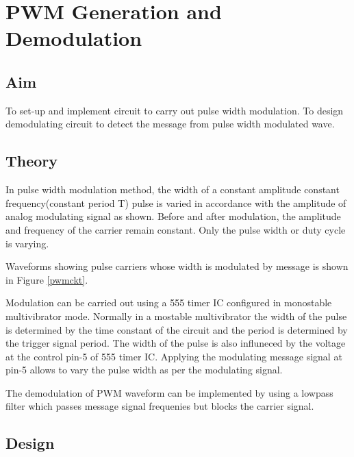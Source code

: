 \chapter[PWM Generation and Demodulation]{PWM Generation and Demodulation}

\section*{Aim}

To set-up and implement circuit to carry out pulse width modulation. To design demodulating circuit to detect the message from pulse width modulated wave.
\section*{Theory}
In pulse width modulation method, the width of a constant amplitude constant frequency(constant period T) pulse is varied in accordance with the amplitude of analog modulating signal as shown. Before and after modulation, the amplitude and frequency of the carrier remain constant. Only the pulse width or duty cycle is varying.

Waveforms showing pulse carriers whose width is modulated by message is shown in Figure  \ref{pwmckt}.

Modulation can be carried out using a 555 timer IC configured in monostable multivibrator mode. Normally in a mostable multivibrator the width of the pulse is determined by the time constant of the circuit and the period is determined by the trigger signal period. The width of the pulse is also influneced by the voltage at the control pin-5 of 555 timer IC.  Applying the modulating message signal at pin-5 allows to vary the pulse width as per the modulating signal. 

The demodulation of PWM waveform can be implemented by using a lowpass filter which passes message signal frequenies but blocks the carrier signal.

%

\section*{Design}

